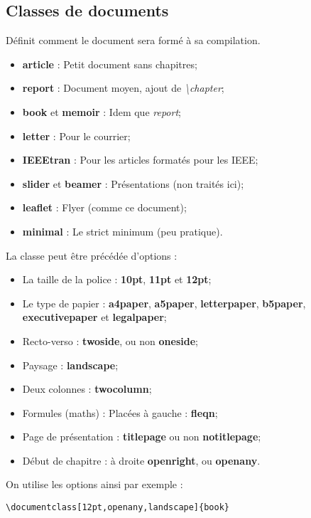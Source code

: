         \subsection{Classes de documents}
            Définit comment le document sera formé à sa compilation.
            \begin{itemize}
                \item \textbf{article} : Petit document sans chapitres;
                \item \textbf{report} : Document moyen, ajout de \textit{\textbackslash chapter};
                \item \textbf{book} et \textbf{memoir} : Idem que \textit{report};
                \item \textbf{letter} : Pour le courrier;
                \item \textbf{IEEEtran} : Pour les articles formatés pour les IEEE;
                \item \textbf{slider} et \textbf{beamer} : Présentations (non traités ici);
                \item \textbf{leaflet} : Flyer (comme ce document);
                \item \textbf{minimal} : Le strict minimum (peu pratique).
            \end{itemize}
            La classe peut être précédée d'options :
            \begin{itemize}
                \item La taille de la police : \textbf{10pt}, \textbf{11pt} et \textbf{12pt};
                \item Le type de papier : \textbf{a4paper}, \textbf{a5paper}, \textbf{letterpaper}, \textbf{b5paper}, \textbf{executivepaper} et \textbf{legalpaper};
                \item Recto-verso : \textbf{twoside}, ou non \textbf{oneside};
                \item Paysage : \textbf{landscape};
                \item Deux colonnes : \textbf{twocolumn};
                \item Formules (maths) : Placées à gauche : \textbf{fleqn};
                \item Page de présentation : \textbf{titlepage} ou non \textbf{notitlepage};
                \item Début de chapitre : à droite \textbf{openright}, ou \textbf{openany}.
            \end{itemize}
            On utilise les options ainsi par exemple :
            \begin{lstlisting}
\documentclass[12pt,openany,landscape]{book}
            \end{lstlisting}
